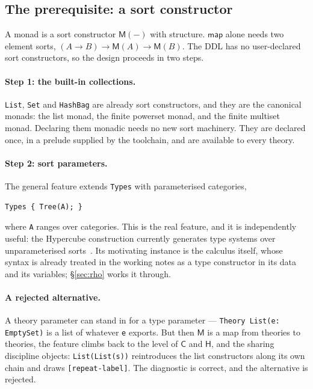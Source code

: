 \documentclass[11pt]{article}
\theoremstyle{definition}
\theoremstyle{plain}
\theoremstyle{remark}
\newcommand{\M}{\mathsf{M}}
\newcommand{\fmap}{\mathsf{map}}
\newcommand{\cost}{\mathsf{C}}
\newcommand{\hist}{\mathsf{H}}
\begin{document}
\subsection{The prerequisite: a sort constructor}

A monad is a sort constructor \(\M(-)\) with structure. \(\fmap\) alone needs
two element sorts, \((A \to B) \to \M(A) \to \M(B)\). The DDL has no
user-declared sort constructors, so the design proceeds in two steps.

\paragraph{Step 1: the built-in collections.} \texttt{List}, \texttt{Set} and
\texttt{HashBag} are already sort constructors, and they are the canonical
monads: the list monad, the finite powerset monad, and the finite multiset
monad. Declaring them monadic needs no new sort machinery. They are declared once,
in a prelude supplied by the toolchain, and are available to every theory.

\paragraph{Step 2: sort parameters.} The general feature extends
\texttt{Types} with parameterised categories,
\begin{lstlisting}[language=mettail]
Types { Tree(A); }
\end{lstlisting}
where \texttt{A} ranges over categories. This is the real feature, and it is
independently useful: the Hypercube construction currently generates type
systems over unparameterised sorts~\cite{Hypercube}. Its motivating instance is
the calculus itself, whose syntax is already treated in the working notes as a
type constructor in its data and its variables; \S\ref{sec:rho} works it
through.

\paragraph{A rejected alternative.} A theory parameter can stand in for a type
parameter --- \texttt{Theory List(e: EmptySet)} is a list of whatever
\texttt{e} exports. But then \(\M\) is a map from theories to theories, the
feature climbs back to the level of \(\cost\) and \(\hist\), and the sharing
discipline objects: \texttt{List(List(s))} reintroduces the list constructors
along its own chain and draws \texttt{[repeat-label]}. The diagnostic is
correct, and the alternative is rejected.
\end{document}
